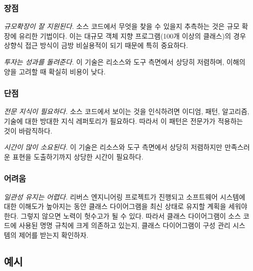 \documentclass[a4paper,10pt,twoside]{book}
\begin{document}
\subsubsection*{장점}

\begin{bulletlist}
\item \emph{규모확장이 잘 지원된다.}
소스 코드에서 무엇을 찾을 수 있을지 추측하는 것은 규모 확장에 유리한 기법이다. 이는 대규모 객체 지향 프로그램(100개 이상의 클래스)의 경우 상향식 접근 방식이 금방 비실용적이 되기 때문에 특히 중요하다.

\item \emph{투자는 성과를 돌려준다.}
이 기술은 리소스와 도구 측면에서 상당히 저렴하며, 이해의 양을 고려할 때 확실히 비용이 낮다.
\end{bulletlist}

\subsubsection*{단점}

\begin{bulletlist}
\item \emph{전문 지식이 필요하다.}
소스 코드에서 보이는 것을 인식하려면 이디엄, 패턴, 알고리즘, 기술에 대한 방대한 지식 레퍼토리가 필요하다. 따라서 이 패턴은 전문가가 적용하는 것이 바람직하다.

\item \emph{시간이 많이 소요된다.}
이 기술은 리소스와 도구 측면에서 상당히 저렴하지만 만족스러운 표현을 도출하기까지 상당한 시간이 필요하다.
\end{bulletlist}

\subsubsection*{어려움}

\begin{bulletlist}
\item \emph{일관성 유지는 어렵다.}
리버스 엔지니어링 프로젝트가 진행되고 소프트웨어 시스템에 대한 이해도가 높아지는 동안 클래스 다이어그램을 최신 상태로 유지할 계획을 세워야 한다. 그렇지 않으면 노력이 헛수고가 될 수 있다. 따라서 클래스 다이어그램이 소스 코드에 사용된 명명 규칙에 크게 의존하고 있는지, 클래스 다이어그램이 구성 관리 시스템의 제어를 받는지 확인하자.
\end{bulletlist}

\subsection*{예시}
\end{document}

